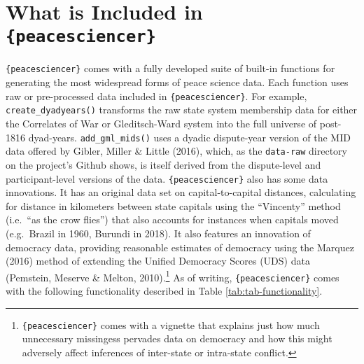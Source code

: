 \documentclass[
  11pt,
]{article}
\begin{document}
\hypertarget{what-is-included-in-peacesciencer}{%
\section{\texorpdfstring{What is Included in \texttt{\{peacesciencer\}}}{What is Included in \{peacesciencer\}}}\label{what-is-included-in-peacesciencer}}

\texttt{\{peacesciencer\}} comes with a fully developed suite of built-in functions for generating the most widespread forms of peace science data. Each function uses raw or pre-processed data included in \texttt{\{peacesciencer\}}. For example, \texttt{create\_dyadyears()} transforms the raw state system membership data for either the Correlates of War or Gleditsch-Ward system into the full universe of post-1816 dyad-years. \texttt{add\_gml\_mids()} uses a dyadic dispute-year version of the MID data offered by Gibler, Miller \& Little (2016), which, as the \texttt{data-raw} directory on the project's Github shows, is itself derived from the dispute-level and participant-level versions of the data. \texttt{\{peacesciencer\}} also has some data innovations. It has an original data set on capital-to-capital distances, calculating for distance in kilometers between state capitals using the ``Vincenty'' method (i.e.~``as the crow flies'') that also accounts for instances when capitals moved (e.g.~Brazil in 1960, Burundi in 2018). It also features an innovation of democracy data, providing reasonable estimates of democracy using the Marquez (2016) method of extending the Unified Democracy Scores (UDS) data (Pemstein, Meserve \& Melton, 2010).\footnote{\texttt{\{peacesciencer\}} comes with a vignette that explains just how much unnecessary missingess pervades data on democracy and how this might adversely affect inferences of inter-state or intra-state conflict.} As of writing, \texttt{\{peacesciencer\}} comes with the following functionality described in Table \ref{tab:tab-functionality}.
\end{document}
